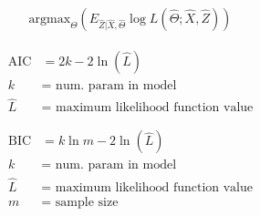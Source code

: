 \documentclass[USenglish,final,authoryear,12pt]{article}
\begin{document}
\begin{align*}
	\text{argmax}_{\Theta}\left(E_{\hat{Z}|\hat{X},\hat{\Theta}}\log L(\hat{\Theta}; \hat{X}, \hat{Z})\right)
\end{align*}

\begin{align*}
	\text{AIC} &= 2k - 2\ln(\hat{L})\\
	k &= \text{ num. param in model}\\
	\hat{L} &= \text{ maximum likelihood function value}
\end{align*}

\begin{align*}
\text{BIC} &= k\ln m - 2\ln(\hat{L})\\
k &= \text{ num. param in model}\\
\hat{L} &= \text{ maximum likelihood function value}\\
m &= \text{ sample size}
\end{align*}
\end{document}
